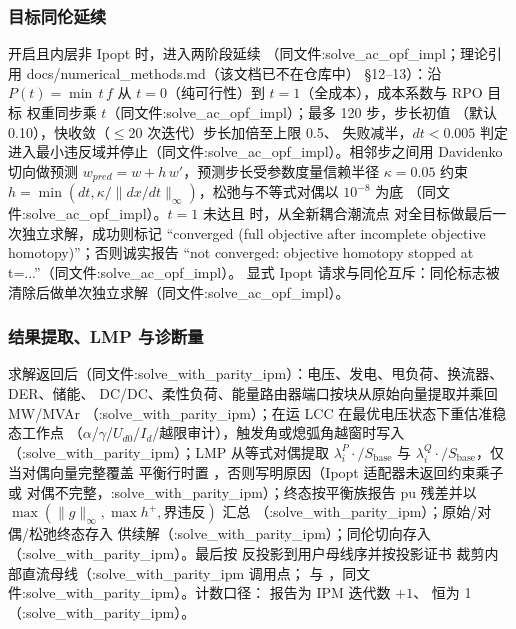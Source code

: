 \subsubsection*{目标同伦延续}
 开启且内层非 Ipopt 时，进入两阶段延续
（同文件:solve\_ac\_opf\_impl；理论引用 docs/numerical\_methods.md（该文档已不在仓库中） §12--13）：沿
$P(t)=\min\,t\,f$ 从 $t=0$（纯可行性）到 $t=1$（全成本），成本系数与 RPO 目标
权重同步乘 $t$（同文件:solve\_ac\_opf\_impl）；最多 120 步，步长初值
（默认 0.10），快收敛（$\le20$ 次迭代）步长加倍至上限 0.5、
失败减半，$dt<0.005$ 判定进入最小违反域并停止（同文件:solve\_ac\_opf\_impl）。相邻步之间用 Davidenko 切向做预测
$w_{pred}=w+h\,w'$，预测步长受参数度量信赖半径 $\kappa=0.05$ 约束
$h=\min(dt,\kappa/\lVert dx/dt\rVert_\infty)$，松弛与不等式对偶以 $10^{-8}$ 为底
（同文件:solve\_ac\_opf\_impl）。$t=1$ 未达且  时，从全新耦合潮流点
对全目标做最后一次独立求解，成功则标记
``converged (full objective after incomplete objective homotopy)''；否则诚实报告
``not converged: objective homotopy stopped at t=...''（同文件:solve\_ac\_opf\_impl）。
显式 Ipopt 请求与同伦互斥：同伦标志被清除后做单次独立求解（同文件:solve\_ac\_opf\_impl）。

\subsubsection*{结果提取、LMP 与诊断量}
求解返回后（同文件:solve\_with\_parity\_ipm）：电压、发电、甩负荷、换流器、DER、储能、
DC/DC、柔性负荷、能量路由器端口按块从原始向量提取并乘回 MW/MVAr
（:solve\_with\_parity\_ipm）；在运 LCC 在最优电压状态下重估准稳态工作点
（$\alpha$/$\gamma$/$U_{d0}$/$I_d$/越限审计），触发角或熄弧角越窗时写入
（:solve\_with\_parity\_ipm）；LMP 从等式对偶提取
$\lambda^{P}_i\cdot$$/S_{\mathrm{base}}$ 与
$\lambda^{Q}_i\cdot$$/S_{\mathrm{base}}$，仅当对偶向量完整覆盖
平衡行时置 ，否则写明原因（Ipopt 适配器未返回约束乘子或
对偶不完整，:solve\_with\_parity\_ipm）；终态按平衡族报告 pu 残差并以
$\max(\lVert g\rVert_\infty,\max h^{+},\text{界违反})$ 汇总
（:solve\_with\_parity\_ipm）；原始/对偶/松弛终态存入
 供续解（:solve\_with\_parity\_ipm）；同伦切向存入 
（:solve\_with\_parity\_ipm）。最后按  反投影到用户母线序并按投影证书
裁剪内部直流母线（:solve\_with\_parity\_ipm 调用点；
与 ，同文件:solve\_with\_parity\_ipm）。计数口径：
 报告为 IPM 迭代数 $+1$、 恒为 1
（:solve\_with\_parity\_ipm）。

